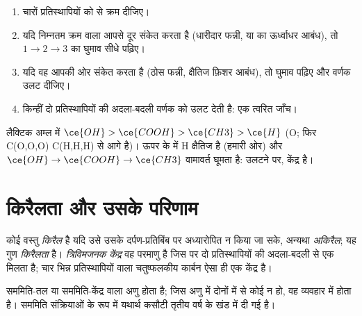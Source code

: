 \begin{method}\label{met:b1:stereochemistry-in-depth:cip}
\begin{enumerate}
  \item चारों प्रतिस्थापियों को  से क्रम दीजिए।
  \item यदि निम्नतम क्रम वाला आपसे दूर संकेत करता है (धारीदार फन्नी, या
         का ऊर्ध्वाधर आबंध), तो
        $1 \to 2 \to 3$ का घुमाव सीधे पढ़िए।
  \item यदि वह आपकी ओर संकेत करता है (ठोस फन्नी, क्षैतिज फ़िशर आबंध),
        तो घुमाव पढ़िए और वर्णक उलट दीजिए।
  \item किन्हीं दो प्रतिस्थापियों की अदला-बदली वर्णक को उलट देती है: एक त्वरित
        जाँच।
\end{enumerate}
लैक्टिक अम्ल में $\ce{OH} > \ce{COOH} > \ce{CH3} > \ce{H}$ (O; फिर C(O,O,O)
C(H,H,H) से आगे है)। ऊपर के  में H क्षैतिज है
(हमारी ओर) और $\ce{OH} \to \ce{COOH} \to \ce{CH3}$ वामावर्त घूमता है:
उलटने पर, केंद्र  है।
\end{method}

\section{किरैलता और उसके परिणाम}

\begin{definition}[त्रिविमजनक केंद्र, किरैलता]\label{def:b1:stereochemistry-in-depth:stereocentre}
कोई वस्तु \emph{किरैल} है यदि उसे उसके
दर्पण-प्रतिबिंब पर अध्यारोपित न किया जा सके, अन्यथा \emph{अकिरैल}; यह गुण
\emph{किरैलता} है। \emph{त्रिविमजनक
केंद्र} वह परमाणु है जिस पर दो प्रतिस्थापियों की
अदला-बदली से एक  मिलता है; चार भिन्न प्रतिस्थापियों वाला
चतुष्फलकीय कार्बन ऐसा ही एक केंद्र है।
\end{definition}

सममिति-तल या सममिति-केंद्र वाला अणु  होता है;
जिस अणु में दोनों में से कोई न हो, वह व्यवहार में  होता है। सममिति संक्रियाओं
के रूप में यथार्थ कसौटी तृतीय वर्ष के खंड में दी गई है।

